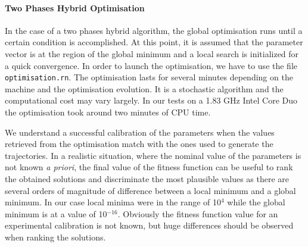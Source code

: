 \documentclass[a4paper, 11pt]{article}
\begin{document}
  \paragraph{Two Phases Hybrid Optimisation}
  In the case of a two phases hybrid algorithm, the global optimisation runs until a certain condition is accomplished.
  At this point, it is assumed that the parameter vector is at the region of the global minimum and a local search is initialized for a quick convergence.
  In order to launch the optimisation, we have to use the file \texttt{optimisation.rn}.
  The optimisation lasts for several minutes depending on the machine and the optimisation evolution. 
  It is a stochastic algorithm and the computational cost may vary largely. 
  In our tests on a 1.83 GHz Intel Core Duo the optimisation took around two minutes of CPU time.

  We understand a successful calibration of the parameters when the values retrieved from the optimisation match with the ones used to generate the trajectories. 
  In a realistic situation, where the nominal value of the parameters is not known \textit{a priori}, the final value of the fitness function can be useful to rank the obtained solutions and discriminate the most plausible values as there are several orders of magnitude of difference between a local minimum and a global minimum. 
  In our case local minima were in the range of 10$^4$ while the global minimum is at a value of 10$^{-16}$.
  Obviously the fitness function value for an experimental calibration is not known, but huge differences should be observed when ranking the solutions.
\end{document}
